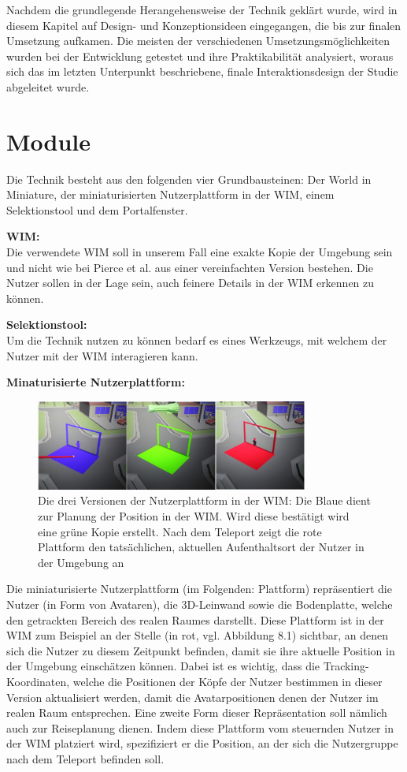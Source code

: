 Nachdem die grundlegende Herangehensweise der Technik geklärt wurde, wird in diesem Kapitel auf Design- und Konzeptionsideen eingegangen, die bis zur finalen Umsetzung aufkamen. Die meisten der verschiedenen Umsetzungsmöglichkeiten wurden bei der Entwicklung getestet und ihre Praktikabilität analysiert, woraus sich das im letzten Unterpunkt beschriebene, finale Interaktionsdesign der Studie abgeleitet wurde.

\section{Module}
Die Technik besteht aus den folgenden vier Grundbausteinen: Der World in Miniature, der miniaturisierten Nutzerplattform in der WIM, einem Selektionstool und dem Portalfenster.

\textbf{WIM:}\\
Die verwendete WIM soll in unserem Fall eine exakte Kopie der Umgebung sein und nicht wie bei Pierce et al. aus einer vereinfachten Version bestehen. Die Nutzer sollen in der Lage sein, auch feinere Details in der WIM erkennen zu können. 

 \textbf{Selektionstool:}\\
Um die Technik nutzen zu können bedarf es eines Werkzeugs, mit welchem der Nutzer mit der WIM interagieren kann. 

\textbf{Minaturisierte Nutzerplattform:}\\
\begin{figure}[h!]
  \centering
  \includegraphics[width=0.8\textwidth]{images/platform_bgr.jpg}
  \caption{Die drei Versionen der Nutzerplattform in der WIM: Die Blaue dient zur Planung der Position in der WIM. Wird diese bestätigt wird eine grüne Kopie erstellt. Nach dem Teleport zeigt die rote Plattform den tatsächlichen, aktuellen Aufenthaltsort der Nutzer in der Umgebung an}
  \label{fig:todo}
\end{figure}
Die miniaturisierte Nutzerplattform (im Folgenden: Plattform) repräsentiert die Nutzer (in Form von Avataren), die 3D-Leinwand sowie die Bodenplatte, welche den getrackten Bereich des realen Raumes darstellt. Diese Plattform ist in der WIM zum Beispiel an der Stelle (in rot, vgl. Abbildung 8.1) sichtbar, an denen sich die Nutzer zu diesem Zeitpunkt befinden, damit sie ihre aktuelle Position in der Umgebung einschätzen können. Dabei ist es wichtig, dass die Tracking-Koordinaten, welche die Positionen der Köpfe der Nutzer bestimmen in dieser Version aktualisiert werden, damit die Avatarpositionen denen der Nutzer im realen Raum entsprechen. Eine zweite Form dieser Repräsentation soll nämlich auch zur Reiseplanung dienen. Indem diese Plattform vom steuernden Nutzer in der WIM platziert wird, spezifiziert er die Position, an der sich die Nutzergruppe nach dem Teleport befinden soll.

